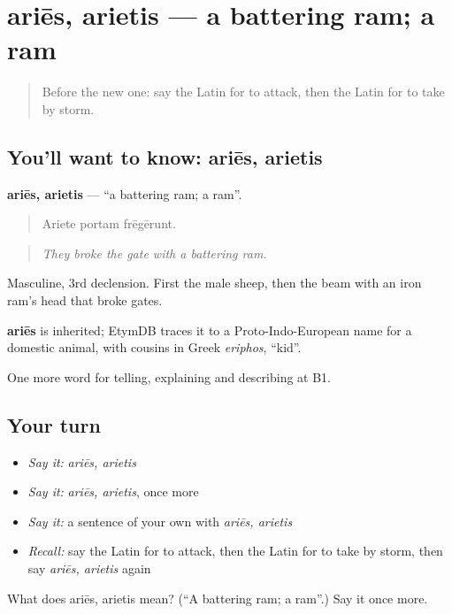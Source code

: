 \section[ariēs, arietis]{ariēs, arietis — a battering ram; a ram}

\label{lesson:LA-C341-aries}



\begin{quote}
Before the new one: say the Latin for to attack, then the Latin for to take by storm.
\end{quote}

\subsection*{You'll want to know: ariēs, arietis}
\textbf{ariēs, arietis} — \textquotedblleft{}a battering ram; a ram\textquotedblright{}.

\begin{quote}
Ariete portam frēgērunt.
\end{quote}

\begin{quote}
\emph{They broke the gate with a battering ram.}
\end{quote}

Masculine, 3rd declension. First the male sheep, then the beam with an iron ram's head that broke gates.

\begin{cousinweb}
\textbf{ariēs} is inherited; EtymDB traces it to a Proto-Indo-European name for a domestic animal, with cousins in Greek \emph{eriphos}, \textquotedblleft{}kid\textquotedblright{}.
\end{cousinweb}

\begin{grammarlens}[title={What you've built}]
One more word for telling, explaining and describing at B1.
\end{grammarlens}

\subsection*{Your turn}
\begin{itemize}
\raggedright
  \item \emph{Say it:} \emph{ariēs, arietis}
  \item \emph{Say it:} \emph{ariēs, arietis}, once more
  \item \emph{Say it:} a sentence of your own with \emph{ariēs, arietis}
  \item \emph{Recall:} say the Latin for to attack, then the Latin for to take by storm, then say \emph{ariēs, arietis} again
\end{itemize}

\begin{tcolorbox}[breakable,colback=teal!4,colframe=teal!35!black,title={Before you move on}]
What does ariēs, arietis mean? (\textquotedblleft{}A battering ram; a ram\textquotedblright{}.) Say it once more.
\end{tcolorbox}
